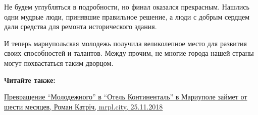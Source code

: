 Не будем углубляться в подробности, но финал оказался прекрасным. Нашлись одни
мудрые люди, принявшие правильное решение, а люди с добрым сердцем дали
средства для ремонта исторического здания.

И теперь мариупольская молодежь получила великолепное место для развития своих
способностей и талантов. Между прочим, не многие города нашей страны могут
похвастаться таким дворцом.

\textbf{Читайте также:} 

\href{https://mrpl.city/news/view/prevrashhenie-molodezhnogo-v-otel-kontinental-v-mariupole-zajmet-ot-shesti-mesyatsev}{%
Превращение \enquote{Молодежного} в \enquote{Отель Континенталь} в Мариуполе займет от шести месяцев, Роман Катріч, mrpl.city, 25.11.2018}
